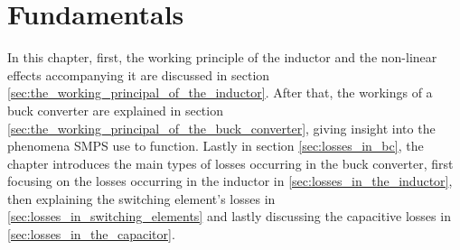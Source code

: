 
\chapter{Fundamentals} \label{sec:fundamentals}
In this chapter, first, the working principle of the inductor and the non-linear effects accompanying it are discussed in section \ref{sec:the_working_principal_of_the_inductor}. After that, the workings of a buck converter are explained in section \ref{sec:the_working_principal_of_the_buck_converter}, giving insight into the phenomena \ac{SMPS} use to function. Lastly in section \ref{sec:losses_in_bc}, the chapter introduces the main types of losses occurring in the buck converter, first focusing on the losses occurring in the inductor in \ref{sec:losses_in_the_inductor}, then explaining the switching element's losses in \ref{sec:losses_in_switching_elements} and lastly discussing the capacitive losses in \ref{sec:losses_in_the_capacitor}. 
